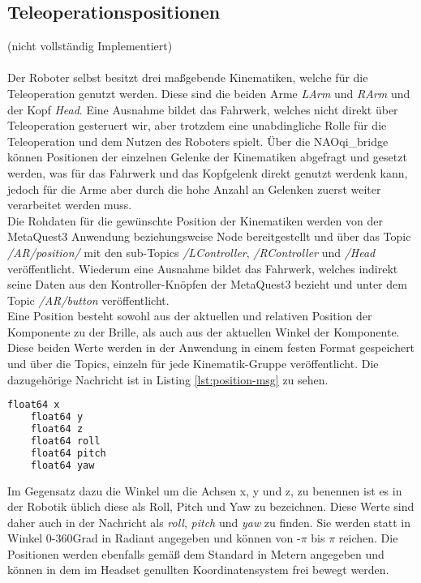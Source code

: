 \subsection{Teleoperationspositionen}
(nicht vollständig Implementiert)\\\\
Der Roboter selbst besitzt drei maßgebende Kinematiken, welche für die Teleoperation genutzt werden. Diese sind die beiden Arme  \textit{LArm} und \textit{RArm} und der Kopf \textit{Head}. Eine Ausnahme bildet das Fahrwerk, welches nicht direkt über Teleoperation gesteruert wir, aber trotzdem eine unabdingliche Rolle für die Teleoperation und dem Nutzen des Roboters spielt. Über die NAOqi\_bridge können Positionen der einzelnen Gelenke der Kinematiken abgefragt und gesetzt werden, was für das Fahrwerk und das Kopfgelenk direkt genutzt werdenk kann, jedoch für die Arme aber durch die hohe Anzahl an Gelenken zuerst weiter verarbeitet werden muss.
\\

\noindent
Die Rohdaten für die gewünschte Position der Kinematiken werden von der MetaQuest3 Anwendung beziehungsweise Node bereitgestellt und über das Topic \textit{/AR/position/} mit den sub-Topics \textit{/LController}, \textit{/RController} und \textit{/Head} veröffentlicht. Wiederum eine Ausnahme bildet das Fahrwerk, welches indirekt seine Daten aus den Kontroller-Knöpfen der MetaQuest3 bezieht und unter dem Topic \textit{/AR/button} veröffentlicht.
\\

\noindent
Eine Position besteht sowohl aus der aktuellen und relativen Position der Komponente zu der Brille, als auch aus der aktuellen Winkel der Komponente. Diese beiden Werte werden in der Anwendung in einem festen Format gespeichert und über die Topics, einzeln für jede Kinematik-Gruppe veröffentlicht. Die dazugehörige Nachricht ist in Listing \autoref{lst:position-msg} zu sehen.\\
\begin{lstlisting}[language=Python, caption=Positions Topic, label=lst:position-msg]
    float64 x
    float64 y
    float64 z
    float64 roll
    float64 pitch
    float64 yaw
\end{lstlisting}
Im Gegensatz dazu die Winkel um die Achsen x, y und z, zu benennen ist es in der Robotik üblich diese als Roll, Pitch und Yaw zu bezeichnen. Diese Werte sind daher auch in der Nachricht als \textit{roll}, \textit{pitch} und \textit{yaw} zu finden. Sie werden statt in Winkel 0-360Grad in Radiant angegeben und können von -$\pi$ bis $\pi$ reichen. Die Positionen werden ebenfalls gemäß dem Standard in Metern angegeben und können in dem im Headset genullten Koordinatensystem frei bewegt werden.
\\

